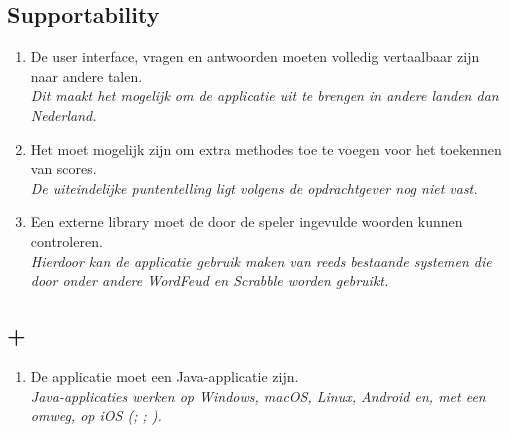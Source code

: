\subsection{Supportability}
\begin{enumerate}[resume*]
   \item De user interface, vragen en antwoorden moeten volledig vertaalbaar zijn naar andere talen.
         \\ \textit{Dit maakt het mogelijk om de applicatie uit te brengen in andere landen dan Nederland.}

   \item Het moet mogelijk zijn om extra methodes toe te voegen voor het toekennen van scores.
         \\ \textit{De uiteindelijke puntentelling ligt volgens de opdrachtgever nog niet vast.}

   \item Een externe library moet de door de speler ingevulde woorden kunnen controleren.
         \\ \textit{Hierdoor kan de applicatie gebruik maken van reeds bestaande systemen die door onder andere WordFeud en Scrabble worden gebruikt.}
\end{enumerate}

\subsection{+}
\begin{enumerate}[resume*]
   \item De applicatie moet een Java-applicatie zijn.
         \\ \textit{Java-applicaties werken op Windows, macOS, Linux, Android en, met een omweg, op iOS (\cite{oracle}; \cite{androidfundamentals}; \cite{multios}).}
\end{enumerate}




